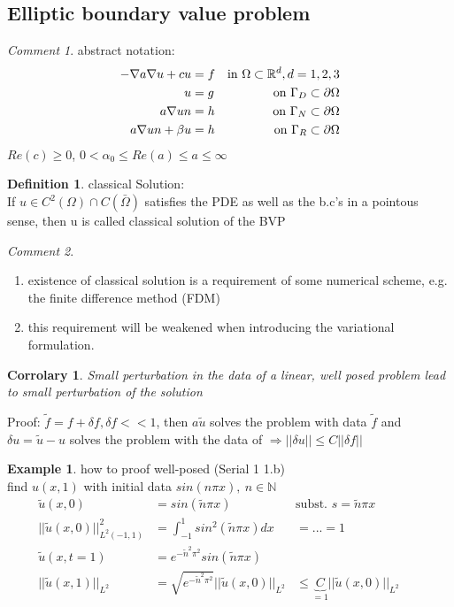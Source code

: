 \documentclass[english]{article}
\newtheorem*{corr}{Corrolary}
\theoremstyle{definition}
\newtheorem*{defi}{Definition}
\newtheorem*{exa}{Example}
\theoremstyle{remark}
\newtheorem*{comm}{Comment}
\newcommand{\p}{\partial}
\newcommand{\NN}{\mathbb{N}}			%
\newcommand{\RR}{\mathbb{R}}			%
\renewcommand{\aa}{\alpha}		%
\newcommand{\bb}{\beta}					%
\newcommand{\OO}{\Omega}
\newcommand{\drw}{\Rightarrow}			%
\newcommand{\tx}[1]{\text{#1}}
\begin{document}
\subsection{Elliptic boundary value problem}
\begin{comm}abstract notation:\\
  \begin{align*}
    -\nabla a \nabla u + c u &= f& \tx{in } \OO\subset\RR^d,d=1,2,3\\
    u&=g & \tx{on }\GG_D \subset \p \OO\\
    a\nabla u n&=h &\tx{on } \GG_N \subset \p \OO \\
    a \nabla u n + \bb u &= h & \tx{on }\GG_{R}\subset \p \OO
  \end{align*}
  $Re(c)\geq 0$, $0<\aa_0\leq Re(a) \leq a \leq \infty$\end{comm}
\begin{defi}classical Solution:\\
  If $u \in C^2(\OO)\cap C(\bar\OO)$ satisfies the PDE as well as the b.c's in a pointous sense, then u is called classical solution of the BVP
\end{defi}
\begin{comm}
  \begin{enumerate}
  \item existence of classical solution is a requirement of some numerical scheme, e.g. the finite difference method (FDM)
  \item this requirement will be weakened when introducing the variational formulation.
  \end{enumerate}
\end{comm}
\begin{corr}
  Small perturbation in the data of a linear, well posed problem lead to small perturbation of the solution
\end{corr}
Proof: $\tilde f = f + \delta f , \delta f <<1$, then $a \tilde u$ solves the problem with data $\tilde f$ and $\delta u = \tilde u - u$ solves the problem with the data of $\drw ||\delta u || \leq C||\delta f||$

\begin{exa} how to proof well-posed (Serial 1 1.b)\\
  find $u(x,1) $ with initial data $sin(n\pi x) ,\ n \in \NN$
  \begin{align*}
    \tilde u (x,0) &= sin(\tilde n \pi x)& \tx{subst. } s=\tilde n \pi x\\
    ||\tilde u (x,0)||^2_{L^2(-1,1)} &= \int^1_{-1}sin^2(\tilde n \pi x) dx &=... = 1\\
    \tilde u (x,t=1) &= e^{-\tilde n^2\pi^2}sin(\tilde n \pi x)\\
    ||\tilde u (x,1)||_{L^2}&= \sqrt{e^{-\tilde n ^2 \pi^2}}||\tilde u(x,0)||_{L^2} 
    &\leq \underbrace{C}_{=1} ||\tilde u (x,0)||_{L^2} &\quad
  \end{align*}
\end{exa}
\end{document}
